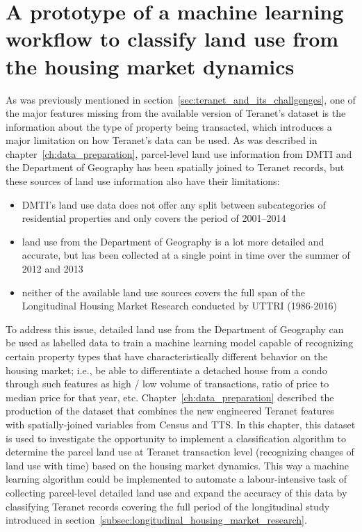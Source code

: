 \chapter{A prototype of a machine learning workflow to classify land use from the housing market dynamics} \label{ch:ml_workflow}

As was previously mentioned in section~\ref{sec:teranet_and_its_challgenges}, one of the major features missing from the available version of Teranet's dataset is the information about the type of property being transacted, which introduces a major limitation on how Teranet's data can be used.
As was described in chapter~\ref{ch:data_preparation}, parcel-level land use information from DMTI and the Department of Geography has been spatially joined to Teranet records, but these sources of land use information also have their limitations:

\begin{itemize}
    \item DMTI's land use data does not offer any split between subcategories of residential properties and only covers the period of 2001--2014
    \item land use from the Department of Geography is a lot more detailed and accurate, but has been collected at a single point in time over the summer of 2012 and 2013
    \item neither of the available land use sources covers the full span of the Longitudinal Housing Market Research conducted by UTTRI (1986-2016)
\end{itemize}

To address this issue, detailed land use from the Department of Geography can be used as labelled data to train a machine learning model capable of recognizing certain property types that have characteristically different behavior on the housing market;
i.e., be able to differentiate a detached house from a condo through such features as high / low volume of transactions, ratio of price to median price for that year, etc.
Chapter~\ref{ch:data_preparation} described the production of the dataset that combines the new engineered Teranet features with spatially-joined variables from Census and TTS\@.
In this chapter, this dataset is used to investigate the opportunity to implement a classification algorithm to determine the parcel land use at Teranet transaction level (recognizing changes of land use with time) based on the housing market dynamics.
This way a machine learning algorithm could be implemented to automate a labour-intensive task of collecting parcel-level detailed land use and expand the accuracy of this data by classifying Teranet records covering the full period of the longitudinal study introduced in section~\ref{subsec:longitudinal_housing_market_research}.

